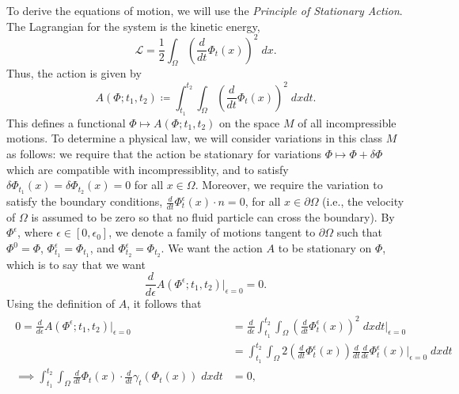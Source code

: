 \documentclass{article}
\begin{document}
To derive the equations of motion, we will use the \textit{Principle of Stationary Action}. The Lagrangian for the system is the kinetic energy, 
\begin{equation*}
	\mathcal{L} = \frac{1}{2}\int_{\Omega}\left(\frac{d}{dt}\Phi_{t}(x)\right)^{2}\;dx. 
\end{equation*} 
Thus, the action is given by 
\begin{equation*}
	A(\Phi; t_{1}, t_{2}) \coloneqq \int_{t_{1}}^{t_{2}}\int_{\Omega}\left(\frac{d}{dt}\Phi_{t}(x)\right)^{2}\;dxdt. 
\end{equation*} 
This defines a functional $\Phi \mapsto A(\Phi; t_{1}, t_{2})$ on the space $M$ of all incompressible motions. To determine a physical law, we will consider variations in this class $M$ as follows: we require that the action be stationary for variations $\Phi \mapsto \Phi + \delta \Phi$ which are compatible with incompressiblity, and to satisfy $\delta \Phi_{t_1}(x) = \delta\Phi_{t_{2}}(x) = 0$ for all $x \in \Omega$. Moreover, we require the variation to satisfy the boundary conditions, $\frac{d}{dt}\Phi^{\epsilon}_{t}(x) \cdot n = 0$, for all $x \in \partial \Omega$ (i.e., the velocity of $\Omega$ is assumed to be zero so that no fluid particle can cross the boundary). By $\Phi^{\epsilon}$, where $\epsilon \in [0,\epsilon_{0}]$, we denote a family of motions tangent to $\partial \Omega$ such that $\Phi^{0} = \Phi$, $\Phi_{t_{1}}^{\epsilon} =\Phi_{t_{1}}$, and $\Phi^{\epsilon}_{t_{2}} = \Phi_{t_{2}}$. We want the action $A$ to be stationary on $\Phi$, which is to say that we want 
\begin{equation*}
	\frac{d}{d\epsilon}A(\Phi^{\epsilon}; t_{1}, t_{2})|_{\epsilon =0} = 0. 
\end{equation*}
Using the definition of $A$, it follows that 
\begin{align*}
	\begin{split}
		0 = \frac{d}{d\epsilon}A(\Phi^{\epsilon};t_{1}, t_{2})|_{\epsilon = 0} &= \frac{d}{d\epsilon}\int_{t_{1}}^{t_{2}}\int_{\Omega}\left(\frac{d}{dt}\Phi_{t}^{\epsilon}(x)\right)^{2}\;dxdt\bigg|_{\epsilon = 0} \\
		&= \int_{t_{1}}^{t_{2}}\int_{\Omega}2\left(\frac{d}{dt}\Phi_{t}^{\epsilon}(x)\right)\frac{d}{dt}\frac{d}{d\epsilon}\Phi_{t}^{\epsilon}(x)\bigg|_{\epsilon = 0}\;dxdt \\
		\implies 
		\int_{t_{1}}^{t_{2}}\int_{\Omega}\frac{d}{dt}\Phi_{t}(x) \cdot \frac{d}{dt}\gamma_{t}(\Phi_{t}(x))\;dxdt &= 0, 
	\end{split} 
\end{align*} 
\end{document}
